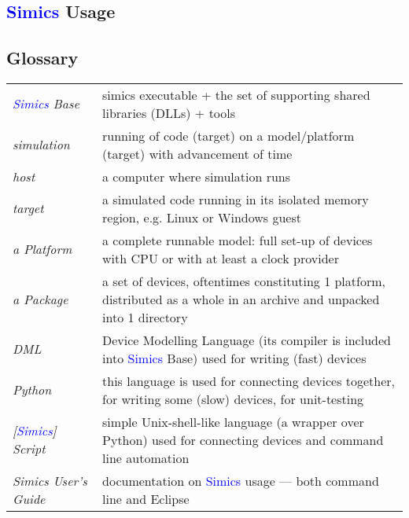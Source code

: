\documentclass[8pt]{extarticle}
\newcommand{\cod}[1]{\colorbox{green!15}{#1}}
\newcommand{\Simics}{\textcolor{blue}{Simics}}
\newlength{\MyLen}
\begin{document}
\setlength\emergencystretch{\hsize}


\begin{multicols*}{3}

\section{\Simics{} Usage}

\subsection{Glossary}
    \begin{tabular}{p{\the\MyLen}p{\linewidth-\the\MyLen-0.8cm}}
        \textit{\Simics{} Base} & \cod{simics} executable + the set of
        supporting shared libraries (DLLs) + tools
        \\
        \textit{simulation}  & running of code (target) on
        a model/platform (target) with advancement of time
        \\
        \textit{host}        & a computer where simulation runs
        \\
        \textit{target}      & a simulated
        code running in its isolated memory region, e.g. Linux or
        Windows guest
        \\
        \textit{a Platform}  & a complete runnable model:
        full set-up of devices
        with CPU or with at least a clock provider
        \\
        \textit{a Package}   & a set of devices, oftentimes constituting
        1 platform, distributed as a whole in an archive and unpacked
        into 1 directory
        \\
        \textit{DML}         & Device Modelling Language (its compiler 
        is included into \Simics{} Base) used for writing (fast) devices
        \\
        \textit{Python}      & this language is used for connecting 
        devices together, for writing some (slow) devices, for 
        unit-testing
        \\
        \textit{[\Simics] Script} & simple Unix-shell-like language (a wrapper
        over Python) used for connecting devices and command line 
        automation
        \\
        \textit{Simics User’s Guide} & documentation on \Simics{}
        usage — both command line and Eclipse
    \end{tabular}


\end{multicols*}
\end{document}
